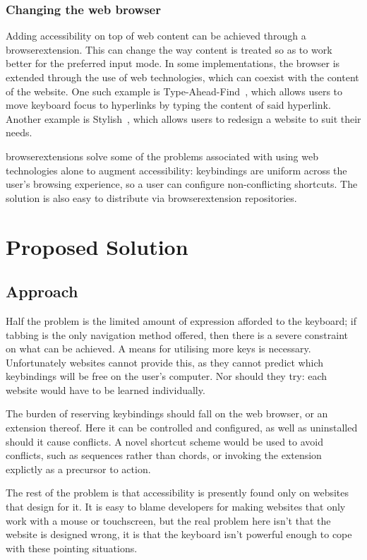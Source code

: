 \documentclass[a4paper, 11pt]{article}
\begin{document}
\subsubsection{Changing the web browser}
Adding accessibility on top of web content can be achieved through a \gls{browserextension}. This can change the way content is treated so as to work better for the preferred input mode. In some implementations, the browser is extended through the use of web technologies, which can coexist with the content of the website.
One such example is Type-Ahead-Find~\cite{typeaheadfind}, which allows users to move keyboard focus to hyperlinks by typing the content of said hyperlink. Another example is Stylish~\cite{stylish}, which allows users to redesign a website to suit their needs.

\Glspl{browserextension} solve some of the problems associated with using web technologies alone to augment accessibility: \glspl{keybinding} are uniform across the user's browsing experience, so a user can configure non-conflicting shortcuts. The solution is also easy to distribute via \gls{browserextension} repositories.
\section{Proposed Solution}
\subsection{Approach}
Half the problem is the limited amount of expression afforded to the keyboard; if tabbing is the only navigation method offered, then there is a severe constraint on what can be achieved. A means for utilising more keys is necessary. Unfortunately websites cannot provide this, as they cannot predict which \glspl{keybinding} will be free on the user's computer. Nor should they try: each website would have to be learned individually.

The burden of reserving \glspl{keybinding} should fall on the web browser, or an extension thereof. Here it can be controlled and configured, as well as uninstalled should it cause conflicts. A novel shortcut scheme would be used to avoid conflicts, such as sequences rather than chords, or invoking the extension explictly as a precursor to action.

The rest of the problem is that accessibility is presently found only on websites that design for it. It is easy to blame developers for making websites that only work with a mouse or touchscreen, but the real problem here isn't that the website is designed wrong, it is that the keyboard isn't powerful enough to cope with these pointing situations.
\end{document}
